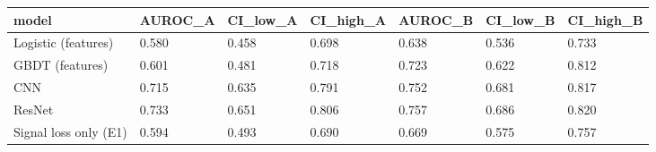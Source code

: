 \begin{tabular}{lllllll}
\toprule
model & AUROC\_A & CI\_low\_A & CI\_high\_A & AUROC\_B & CI\_low\_B & CI\_high\_B \\
\midrule
Logistic (features) & 0.580 & 0.458 & 0.698 & 0.638 & 0.536 & 0.733 \\
GBDT (features) & 0.601 & 0.481 & 0.718 & 0.723 & 0.622 & 0.812 \\
CNN & 0.715 & 0.635 & 0.791 & 0.752 & 0.681 & 0.817 \\
ResNet & 0.733 & 0.651 & 0.806 & 0.757 & 0.686 & 0.820 \\
Signal loss only (E1) & 0.594 & 0.493 & 0.690 & 0.669 & 0.575 & 0.757 \\
\bottomrule
\end{tabular}
